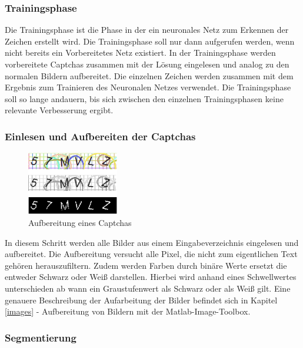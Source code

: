 \subsubsection{Trainingsphase}

Die Trainingsphase ist die Phase in der ein neuronales Netz zum Erkennen der
Zeichen erstellt wird. Die Trainingsphase soll nur dann aufgerufen werden, wenn
nicht bereits ein Vorbereitetes Netz existiert. In der Trainingsphase werden
vorbereitete Captchas zusammen mit der Lösung eingelesen und analog zu den
normalen Bildern aufbereitet. Die einzelnen Zeichen werden zusammen mit dem
Ergebnis zum Trainieren des Neuronalen Netzes verwendet. Die Trainingsphase
soll so lange andauern, bis sich zwischen den einzelnen Trainingsphasen keine
relevante Verbesserung ergibt.

\subsubsection{Einlesen und Aufbereiten der Captchas}

\begin{figure}
  \begin{center}
  \vspace{-48pt}
    \includegraphics[width=4cm]{res/Aufbereitung.png}
  \end{center}
  \caption{Aufbereitung eines Captchas}
\end{figure}

In diesem Schritt werden alle Bilder aus einem Eingabeverzeichnis eingelesen und
aufbereitet. Die Aufbereitung versucht alle Pixel, die nicht zum eigentlichen
Text gehören herauszufiltern. Zudem werden Farben durch binäre Werte ersetzt
die entweder Schwarz oder Weiß darstellen. Hierbei wird anhand eines
Schwellwertes unterschieden ab wann ein Graustufenwert als Schwarz oder als
Weiß gilt. Eine genauere Beschreibung der Aufarbeitung der Bilder befindet sich
in Kapitel \ref{images} - Aufbereitung von Bildern mit der Matlab-Image-Toolbox.


\subsubsection{Segmentierung}

